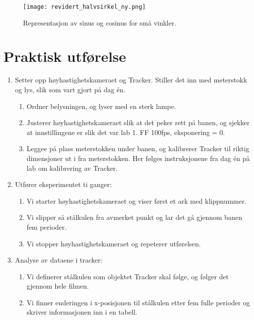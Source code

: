 \documentclass[5p,sort&compress]{elsarticle}
\begin{document}
\begin{figure}[tbp] 
\centering
\texttt{[image: revidert\_halvsirkel\_ny.png]}

\caption{Representasjon av sinus og cosinus for små vinkler.}
\label{fig:pendel} %
\end{figure}


\section{Praktisk utførelse}

\begin{enumerate}  

\item Setter opp høyhastighetskameraet og Tracker. Stiller det inn med meterstokk og lys, slik som vart gjort på dag én. 
\begin{enumerate}
\item Ordner belysningen, og lyser med en sterk lampe. 
\item Justerer høyhastighetskameraet slik at det peker rett på banen, og sjekker at innstillingene er slik det var lab 1. FF 100fps, eksponering = 0.  
\item Leggee på plass meterstokken under banen, og kalibrerer Tracker til riktig dimensjoner ut i fra meterstokken. Her følges instruksjonene fra dag én på lab om kalibrering av Tracker. 
\end{enumerate}
\item Utfører eksperimentet ti ganger:
\begin{enumerate}
\item Vi starter høyhastighetskameraet og viser først et ark med klippnummer. 
\item Vi slipper så stålkulen fra avmerket punkt og lar det gå gjennom banen fem perioder. 
\item Vi stopper høyhastighetskameraet og repeterer utførelsen.
\end{enumerate}
\item Analyse av dataene i tracker:
\begin{enumerate}
\item Vi definerer stålkulen som objektet Tracker skal følge, og følger det gjennom hele filmen. 
\item Vi finner enderingen i x-posisjonen til stålkulen etter fem fulle perioder og skriver informasjonen inn i en tabell.
\end{enumerate}
\end{enumerate}
\end{document}
